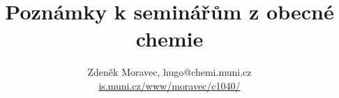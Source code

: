 \documentclass[16pt,a4paper,twoside]{extarticle}
\begin{document}
\title{Poznámky k seminářům z obecné chemie}
\author{Zdeněk Moravec, hugo@chemi.muni.cz \\
		\href{https://is.muni.cz/www/moravec/c1040/}{is.muni.cz/www/moravec/c1040/}}

\maketitle

\newpage
\setcounter{tocdepth}{2}
\tableofcontents


\newpage


\newpage


\newpage


\newpage


\newpage


\newpage


\newpage


\newpage


\newpage


\newpage


\newpage


\newpage


\newpage


\newpage


\newpage


\newpage
\end{document}
